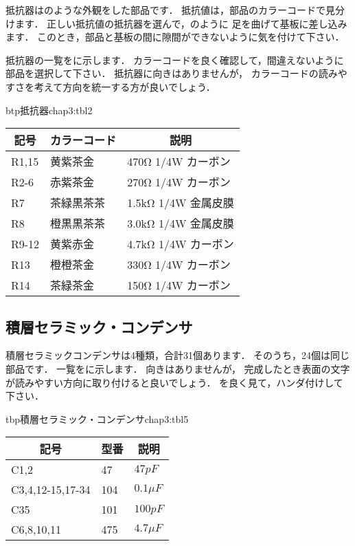 抵抗器はのような外観をした部品です．
抵抗値は，部品のカラーコードで見分けます．
正しい抵抗値の抵抗器を選んで，のように
足を曲げて基板に差し込みます．
このとき，部品と基板の間に隙間ができないように気を付けて下さい．

抵抗器の一覧をに示します．
カラーコードを良く確認して，間違えないように部品を選択して下さい．
抵抗器に向きはありませんが，
カラーコードの読みやすさを考えて方向を統一する方が良いでしょう．


\begin{mytable}{btp}{抵抗器}{chap3:tbl2}
{\small\begin{tabular}{l|l|l}
\hline
\hline
\multicolumn{1}{c|}{記号} &
\multicolumn{1}{c|}{カラーコード} &
\multicolumn{1}{c}{説明} \\
\hline
R1,15 & 黄紫茶金   & 470Ω  1/4W カーボン \\
R2-6  & 赤紫茶金   & 270Ω  1/4W カーボン \\
R7    & 茶緑黒茶茶 & 1.5kΩ 1/4W 金属皮膜 \\
R8    & 橙黒黒茶茶 & 3.0kΩ 1/4W 金属皮膜 \\
R9-12 & 黄紫赤金   & 4.7kΩ 1/4W カーボン \\
R13   & 橙橙茶金   & 330Ω  1/4W カーボン \\
R14   & 茶緑茶金   & 150Ω  1/4W カーボン \\
\end{tabular}}
\end{mytable}

\subsection{積層セラミック・コンデンサ}
積層セラミックコンデンサは4種類，合計31個あります．
そのうち，24個は同じ部品です．
一覧をに示します．
向きはありませんが，
完成したとき表面の文字が読みやすい方向に取り付けると良いでしょう．
を良く見て，ハンダ付けして下さい．

\begin{mytable}{tbp}{積層セラミック・コンデンサ}{chap3:tbl5}
{\small\begin{tabular}{l|l|l}
\hline
\hline
\multicolumn{1}{c|}{記号} &
\multicolumn{1}{c|}{型番} &
\multicolumn{1}{c}{説明} \\
\hline
C1,2             &  47 & $  47 pF $    \\
C3,4,12-15,17-34 & 104 & $ 0.1 \mu F $ \\
C35              & 101 & $ 100 pF $    \\
C6,8,10,11       & 475 & $ 4.7 \mu F $ \\
\end{tabular}}
\end{mytable}

